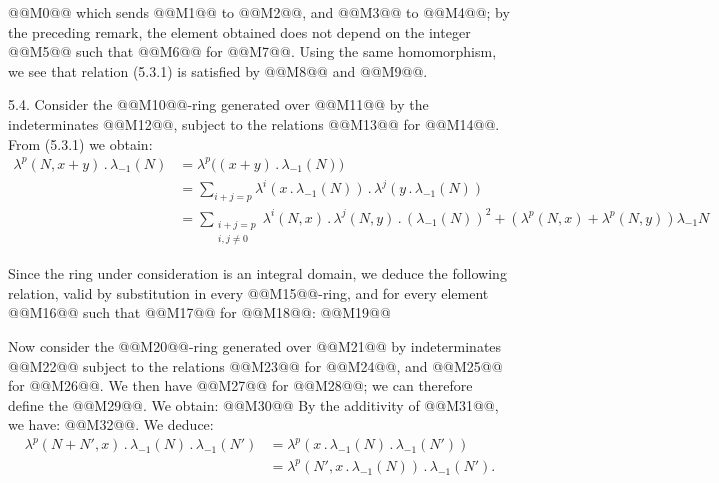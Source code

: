 @@M0@@ which sends @@M1@@ to @@M2@@, and @@M3@@ to @@M4@@; by the preceding remark, the element obtained does not depend on the integer @@M5@@ such that @@M6@@ for @@M7@@. Using the same homomorphism, we see that relation (5.3.1) is satisfied by @@M8@@ and @@M9@@.

5.4. Consider the @@M10@@-ring generated over @@M11@@ by the indeterminates @@M12@@, subject to the relations @@M13@@ for @@M14@@. From (5.3.1) we obtain:
\begin{align*}
  \lambda^p(N,x+y)\mathbin{.}\lambda_{-1}(N)
  &=\lambda^p\bigl((x+y)\mathbin{.}\lambda_{-1}(N)\bigr)\\
  &=\sum_{i+j=p}\lambda^i(x\mathbin{.}\lambda_{-1}(N))\mathbin{.}\lambda^j(y\mathbin{.}\lambda_{-1}(N))\\
  &=\sum_{\substack{i+j=p\\ i,j\ne0}}\lambda^i(N,x)\mathbin{.}\lambda^j(N,y)\mathbin{.}(\lambda_{-1}(N))^2
    +(\lambda^p(N,x)+\lambda^p(N,y))\lambda_{-1}N
\end{align*}

Since the ring under consideration is an integral domain, we deduce the following relation, valid by substitution in every @@M15@@-ring, and for every element @@M16@@ such that @@M17@@ for @@M18@@:
@@M19@@

Now consider the @@M20@@-ring generated over @@M21@@ by indeterminates @@M22@@ subject to the relations @@M23@@ for @@M24@@, and @@M25@@ for @@M26@@. We then have @@M27@@ for @@M28@@; we can therefore define the @@M29@@. We obtain:
@@M30@@
By the additivity of @@M31@@, we have: @@M32@@. We deduce:
\begin{align*}
  \lambda^p(N+N',x)\mathbin{.}\lambda_{-1}(N)\mathbin{.}\lambda_{-1}(N')
  &=\lambda^p(x\mathbin{.}\lambda_{-1}(N)\mathbin{.}\lambda_{-1}(N'))\\
  &=\lambda^p(N',x\mathbin{.}\lambda_{-1}(N))\mathbin{.}\lambda_{-1}(N').
\end{align*}

